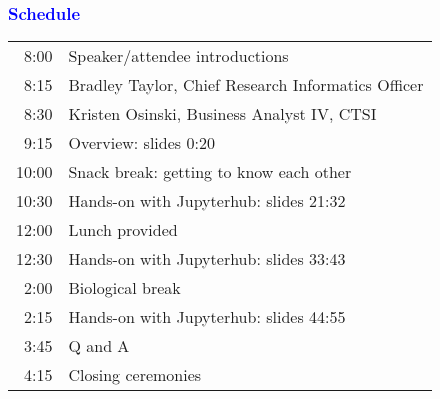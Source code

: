 \documentclass[11pt,pdftex,dvipsnames,usenames]{beamer}
\begin{document}
\begin{frame}[fragile]\frametitle{\bf\textcolor{blue}{Schedule}}

\begin{tabular}{rl}
8:00 & Speaker/attendee introductions \\
8:15 & Bradley Taylor, Chief Research Informatics Officer \\
8:30 & Kristen Osinski, Business Analyst IV, CTSI \\
9:15 & Overview: slides 0:20  \\
10:00& Snack break: getting to know each other \\
10:30& Hands-on with Jupyterhub: slides 21:32  \\
12:00& Lunch provided \\
12:30& Hands-on with Jupyterhub: slides 33:43  \\
2:00 & Biological break \\
2:15 & Hands-on with Jupyterhub: slides 44:55 \\
3:45 & Q and A \\
4:15 & Closing ceremonies
\end{tabular}

\end{frame}

\begin{comment}
\begin{frame}[fragile]\frametitle{\bf\textcolor{blue}{Outline}}

\begin{itemize}
\item Overview
\item Background
\item Timeline
\end{itemize}

\end{frame}
\end{comment}
\end{document}
